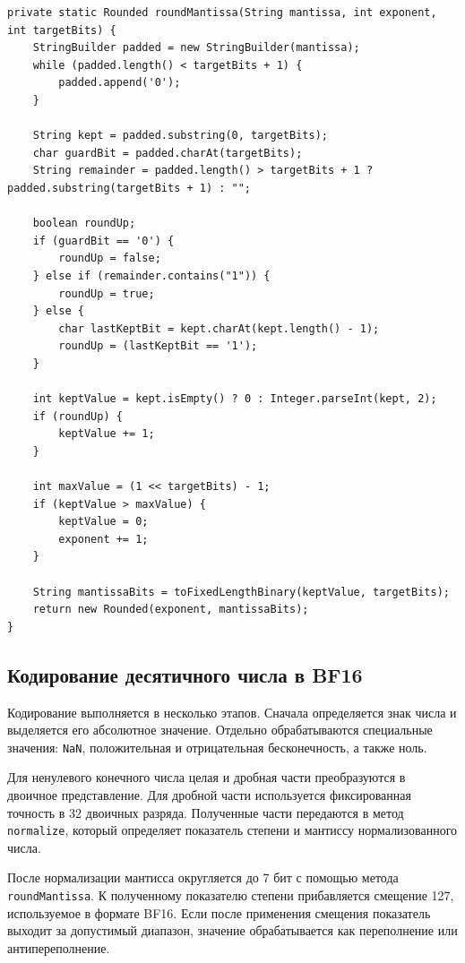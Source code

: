\documentclass[12pt,a4paper]{article}
\begin{document}
\begin{lstlisting}[caption={Округление мантиссы до 7 бит}]
private static Rounded roundMantissa(String mantissa, int exponent, int targetBits) {
    StringBuilder padded = new StringBuilder(mantissa);
    while (padded.length() < targetBits + 1) {
        padded.append('0');
    }

    String kept = padded.substring(0, targetBits);
    char guardBit = padded.charAt(targetBits);
    String remainder = padded.length() > targetBits + 1 ? padded.substring(targetBits + 1) : "";

    boolean roundUp;
    if (guardBit == '0') {
        roundUp = false;
    } else if (remainder.contains("1")) {
        roundUp = true;
    } else {
        char lastKeptBit = kept.charAt(kept.length() - 1);
        roundUp = (lastKeptBit == '1');
    }

    int keptValue = kept.isEmpty() ? 0 : Integer.parseInt(kept, 2);
    if (roundUp) {
        keptValue += 1;
    }

    int maxValue = (1 << targetBits) - 1;
    if (keptValue > maxValue) {
        keptValue = 0;
        exponent += 1;
    }

    String mantissaBits = toFixedLengthBinary(keptValue, targetBits);
    return new Rounded(exponent, mantissaBits);
}
\end{lstlisting}

\subsection{Кодирование десятичного числа в BF16}

Кодирование выполняется в несколько этапов. Сначала определяется знак
числа и выделяется его абсолютное значение. Отдельно обрабатываются
специальные значения: \texttt{NaN}, положительная и отрицательная
бесконечность, а также ноль.

Для ненулевого конечного числа целая и дробная части преобразуются в
двоичное представление. Для дробной части используется фиксированная
точность в 32 двоичных разряда. Полученные части передаются в метод
\texttt{normalize}, который определяет показатель степени и мантиссу
нормализованного числа.

После нормализации мантисса округляется до 7 бит с помощью метода
\texttt{roundMantissa}. К полученному показателю степени прибавляется
смещение 127, используемое в формате BF16. Если после применения
смещения показатель выходит за допустимый диапазон, значение
обрабатывается как переполнение или антипереполнение.
\end{document}
